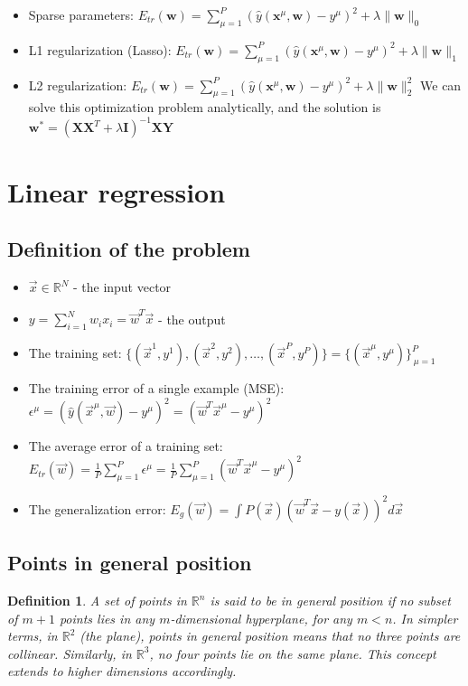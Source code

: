 \documentclass[11pt]{book} %
\newtheorem{definition}{Definition}[section]
\begin{document}
\begin{itemize}
    \item Sparse parameters: $E_{tr}(\mathbf{w}) = \sum_{\mu=1}^{P} (\hat{y}(\mathbf{x}^\mu, \mathbf{w}) - y^\mu)^2 + \lambda \lVert \mathbf{w} \rVert_0$
    \item L1 regularization (Lasso): $E_{tr}(\mathbf{w}) = \sum_{\mu=1}^{P} (\hat{y}(\mathbf{x}^\mu, \mathbf{w}) - y^\mu)^2 + \lambda \lVert \mathbf{w} \rVert_1$
    \item L2 regularization: $E_{tr}(\mathbf{w}) = \sum_{\mu=1}^{P} (\hat{y}(\mathbf{x}^\mu, \mathbf{w}) - y^\mu)^2 + \lambda \lVert \mathbf{w} \rVert_2^2$
        We can solve this optimization problem analytically, and the solution is $\mathbf{w}^* = (\mathbf{X}\mathbf{X}^T + \lambda \mathbf{I})^{-1}\mathbf{X}\mathbf{Y}$
\end{itemize}


%
%
%

\section{Linear regression}
\subsection{Definition of the problem}
\begin{itemize}
    \item $\vec{x} \in \mathbb{R}^N$ - the input vector
    \item $y = \sum_{i=1}^{N} w_i x_i = \vec{w}^T \vec{x}$ - the output
    \item The training set: $\{(\vec{x}^1, y^1), (\vec{x}^2, y^2), \ldots, (\vec{x}^P, y^P)\} = \{(\vec{x}^\mu, y^\mu)\}_{\,\mu=1}^{P}$
    \item The training error of a single example (MSE): $\epsilon^\mu = (\hat{y}(\vec{x}^\mu, \vec{w}) - y^\mu)^2 = (\vec{w}^T \vec{x}^\mu - y^\mu)^2$
    \item The average error of a training set: $E_{tr}(\vec{w}) = \frac{1}{P} \sum_{\mu=1}^{P} \epsilon^\mu = \frac{1}{P} \sum_{\mu=1}^{P} (\vec{w}^T \vec{x}^\mu - y^\mu)^2$
    \item The generalization error: $E_{g}(\vec{w}) = \int P(\vec{x}) (\vec{w}^T \vec{x} - y(\vec{x}))^2 d\vec{x}$
\end{itemize}

%
%

\subsection{Points in general position}
\begin{definition}
A set of points in \(\mathbb{R}^n\) is said to be in \textit{general position} if no subset of \(m+1\) points lies in any \(m\)-dimensional hyperplane, for any \(m < n\). In simpler terms, in \(\mathbb{R}^2\) (the plane), points in general position means that no three points are collinear. Similarly, in \(\mathbb{R}^3\), no four points lie on the same plane. This concept extends to higher dimensions accordingly.
\end{definition}
\end{document}
